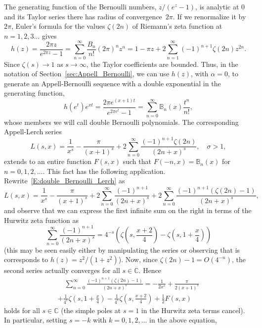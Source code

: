 \documentclass[11pt,a4paper]{amsart}
\newcommand{\C}{\mathbb{C}}
\newcommand{\B}{\mathbb{B}}
\theoremstyle{plain}
\theoremstyle{plain}
\theoremstyle{definition}
\theoremstyle{remark}
\begin{document}
The generating function of the Bernoulli numbers, $z/(e^{z}-1)$, is analytic at $0$ and its Taylor series there has radius of convergence~$2\pi$. If we renormalize it by $2\pi$, Euler's formula for the values $\zeta(2n)$ of Riemann's zeta function at $n=1,2,3\dots$ gives
\[
	h(z) = \frac{2 \pi z}{e^{2 \pi z} - 1}
	     = \sum_{n=0}^{\infty} \frac{B_{n}}{n!} (2\pi)^{n} z^{n}
		 = 1 - \pi z + 2 \sum_{n=1}^{\infty} (-1)^{n+1} \zeta(2n) z^{2n}.
\]
Since $\zeta(s) \to 1$ as $s \to \infty$, the Taylor coefficients  are bounded. Thus, in the notation of Section~\ref{sec:Appell_Bernoulli}, we can use $h(z)$, with $\alpha = 0$, to generate an Appell-Bernoulli sequence with a double exponential in the generating function,
\[
	  h(e^{t}) e^{xt}
	= \frac{2 \pi e^{(x+1) t}}{e^{2 \pi e^{t}} - 1}
	= \sum_{n=0}^{\infty} \mathbb{B}_{n}(x) \frac{t^{n}}{n!},
\]
whose members we will call double Bernoulli polynomials. The corresponding Appell-Lerch series
%
\begin{equation}
\label{E:double_Bernoulli_Lerch}
	L(s,x) = \frac{1}{x^{s}} - \frac{\pi}{(x + 1)^{s}} 
	+ 2 \sum_{n=0}^{\infty} \frac{(-1)^{n+1} \zeta(2n)}{(2n + x)^{s}},
	\quad
	\sigma > 1,
\end{equation}
%
extends to an entire function $F(s,x)$ such that $F(-n,x) = \B_{n}(x)$ for $n=0,1,2,\dots$. This fact has the following application. Rewrite~\eqref{E:double_Bernoulli_Lerch} as
\[
	L(s,x) =   \frac{1}{x^{s}}
	         - \frac{\pi}{(x + 1)^{s}} 
	         + 2 \sum_{n=0}^{\infty} \frac{(-1)^{n+1}}{(2n + x)^{s}}
	         + 2 \sum_{n=0}^{\infty} \frac{(-1)^{n+1} (\zeta(2n) - 1)}{(2n + x)^{s}},
\]
and observe that we can express the first infinite sum on the right in terms of the Hurwitz zeta function as
\[
	  \sum_{n=0}^{\infty} \frac{(-1)^{n+1}}{(2n + x)^{s}}
	= 4^{-s} \left( \zeta\left(s,\frac{x+2}{4}\right) - \zeta\left(s,1+\frac{x}{4}\right) \right)
\]
(this may be seen easily either by manipulating the series or observing that is corresponds to $h(z) = z^{2}/(1 + z^{2})$). Now, since $\zeta(2n) - 1 = O(4^{-n})$, the second series actually converges for all $s \in \C$. Hence
\begin{multline*}
\quad
	  \sum_{n=0}^{\infty} \frac{(-1)^{n+1} (\zeta(2n) - 1)}{(2n + x)^{s}}
	= - \frac{1}{2 x^{s}}
	  + \frac{\pi}{2(x+1)^{s}}
	  \\
	  + \frac{1}{4^{s}}\zeta\left(s,1+\frac{x}{4}\right)
	  - \frac{1}{4^{s}}\zeta\left(s,\frac{x+2}{4}\right)
	  + \frac{1}{2} F(s,x)
\quad
\end{multline*}
holds for all $s \in \C$ (the simple poles at $s=1$ in the Hurwitz zeta terms cancel). In particular, setting $s=-k$ with $k=0,1,2,\dots$ in the above equation, 
\end{document}
